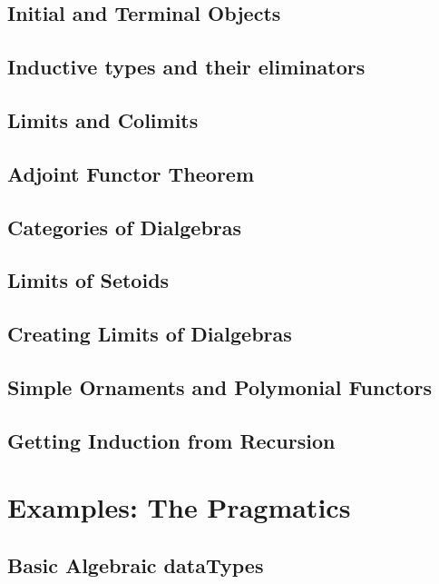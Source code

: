 \documentclass[11pt,oneside]{article}
\begin{document}
\subsection{Initial and Terminal Objects}

\subsection{Inductive types and their eliminators}

\subsection{Limits and Colimits}

\subsection{Adjoint Functor Theorem}

\subsection{Categories of Dialgebras}

\subsection{Limits of Setoids}

\subsection{Creating Limits of Dialgebras}

\subsection{Simple Ornaments and Polymonial Functors}

\subsection{Getting Induction from Recursion}



\section{Examples: The Pragmatics}
\subsection{Basic Algebraic dataTypes}
\end{document}
